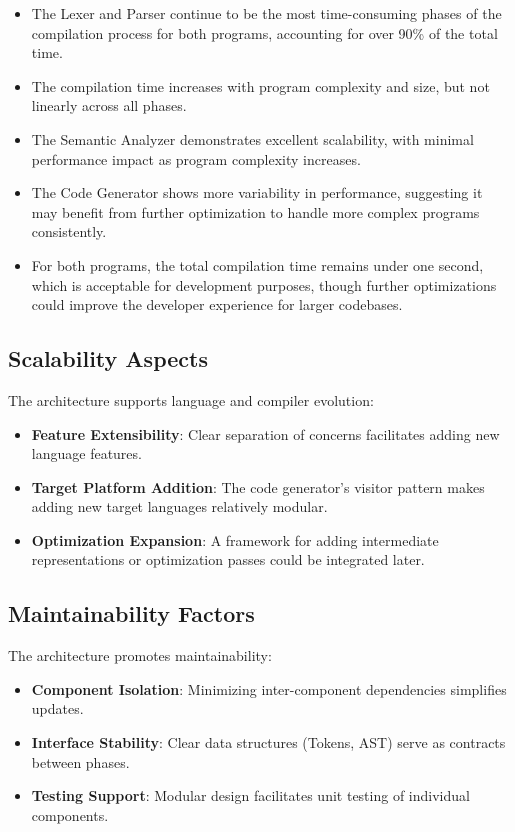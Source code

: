 \documentclass[conference]{IEEEtran}
\begin{document}
\begin{itemize}
	\item The Lexer and Parser continue to be the most time-consuming phases of the compilation process for both programs, accounting for over 90\% of the total time.
	
	\item The compilation time increases with program complexity and size, but not linearly across all phases.
	
	\item The Semantic Analyzer demonstrates excellent scalability, with minimal performance impact as program complexity increases.
	
	\item The Code Generator shows more variability in performance, suggesting it may benefit from further optimization to handle more complex programs consistently.
	
	\item For both programs, the total compilation time remains under one second, which is acceptable for development purposes, though further optimizations could improve the developer experience for larger codebases.
\end{itemize}


\subsection{Scalability Aspects}
The architecture supports language and compiler evolution:
\begin{itemize}
    \item \textbf{Feature Extensibility}: Clear separation of concerns facilitates adding new language features.
    \item \textbf{Target Platform Addition}: The code generator's visitor pattern makes adding new target languages relatively modular.
    \item \textbf{Optimization Expansion}: A framework for adding intermediate representations or optimization passes could be integrated later.
\end{itemize}

\subsection{Maintainability Factors}
The architecture promotes maintainability:
\begin{itemize}
    \item \textbf{Component Isolation}: Minimizing inter-component dependencies simplifies updates.
    \item \textbf{Interface Stability}: Clear data structures (Tokens, AST) serve as contracts between phases.
    \item \textbf{Testing Support}: Modular design facilitates unit testing of individual components.
\end{itemize}
\end{document}
